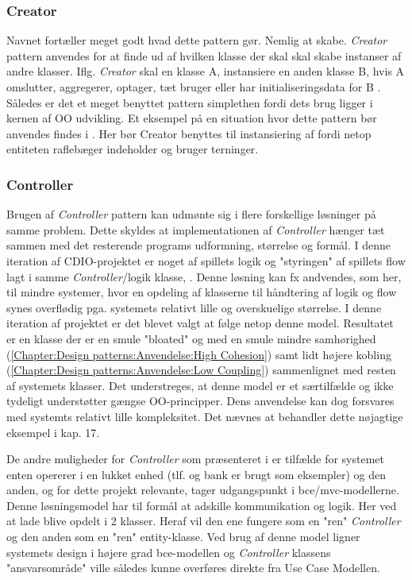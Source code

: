 \subsubsection{Creator}\label{Chapter:Design patterns:Anvendelse:Creator}
Navnet fortæller meget godt hvad dette pattern gør. Nemlig at skabe. \textit{Creator} pattern anvendes for at finde ud af hvilken klasse der skal skal skabe instanser af andre klasser. Iflg. \textit{Creator} skal en klasse A, instansiere en anden klasse B, hvis A omslutter, aggregerer, optager, tæt bruger eller har initialiseringsdata for B \cite{umlbook}. Således er det et meget benyttet pattern simplethen fordi dets brug ligger i kernen af OO udvikling. Et eksempel på en situation hvor dette pattern bør anvendes findes i . Her bør Creator benyttes til instansiering af  fordi netop entiteten raflebæger indeholder og bruger terninger. 

\subsubsection{Controller}\label{Chapter:Design patterns:Anvendelse:Controller}
Brugen af \textit{Controller} pattern kan udmønte sig i flere forskellige løsninger på samme problem. Dette skyldes at implementationen af \textit{Controller} hænger tæt sammen med det resterende programs udformning, størrelse og formål. I denne iteration af CDIO-projektet er noget af spillets logik og "styringen" af spillets flow lagt i samme \textit{Controller}/logik klasse, . Denne løsning kan fx andvendes, som her, til mindre systemer, hvor en opdeling af klasserne til håndtering af logik og flow synes overflødig pga. systemets relativt lille og overskuelige størrelse. I denne iteration af projektet er det blevet valgt at følge netop denne model. Resultatet er en klasse  der er en smule "bloated" og med en smule mindre samhørighed (\vref{Chapter:Design patterns:Anvendelse:High Cohesion}) samt lidt højere kobling (\vref{Chapter:Design patterns:Anvendelse:Low Coupling}) sammenlignet med resten af systemets klasser. Det understreges, at denne model er et særtilfælde og ikke tydeligt understøtter gængse OO-principper. Dens anvendelse kan dog forsvares med systemts relativt lille kompleksitet. Det nævnes at \cite{umlbook} behandler dette nøjagtige eksempel i kap. 17.

De andre muligheder for \textit{Controller} som præsenteret i \cite{umlbook} er tilfælde for systemet enten opererer i en lukket enhed (tlf. og bank er brugt som eksempler) og den anden, og for dette projekt relevante, tager udgangspunkt i bce/mvc-modellerne. Denne løsningsmodel har til formål at adskille kommunikation og logik. Her ved at lade  blive opdelt i 2 klasser. Heraf vil den ene fungere som en "ren" \textit{Controller} og den anden som en "ren" entity-klasse. Ved brug af denne model ligner systemets design i højere grad bce-modellen og \textit{Controller} klassens "ansvarsområde"  ville således kunne overføres direkte fra Use Case Modellen.        




